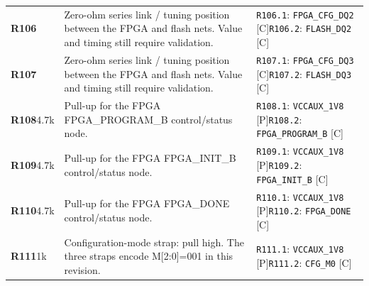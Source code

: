 \documentclass[11pt,a4paper]{article}
\begin{document}
\begin{longtable}{@{}P{27mm}P{83mm}P{58mm}@{}}
\textbf{R106} & Zero-ohm series link / tuning position between the FPGA and flash nets. Value and timing still require validation. & \nolinkurl{R106.1}: \nolinkurl{FPGA_CFG_DQ2} [C]\newline \nolinkurl{R106.2}: \nolinkurl{FLASH_DQ2} [C] \\
\textbf{R107} & Zero-ohm series link / tuning position between the FPGA and flash nets. Value and timing still require validation. & \nolinkurl{R107.1}: \nolinkurl{FPGA_CFG_DQ3} [C]\newline \nolinkurl{R107.2}: \nolinkurl{FLASH_DQ3} [C] \\
\textbf{R108}\newline 4.7k & Pull-up for the FPGA FPGA\_PROGRAM\_B control/status node. & \nolinkurl{R108.1}: \nolinkurl{VCCAUX_1V8} [P]\newline \nolinkurl{R108.2}: \nolinkurl{FPGA_PROGRAM_B} [C] \\
\textbf{R109}\newline 4.7k & Pull-up for the FPGA FPGA\_INIT\_B control/status node. & \nolinkurl{R109.1}: \nolinkurl{VCCAUX_1V8} [P]\newline \nolinkurl{R109.2}: \nolinkurl{FPGA_INIT_B} [C] \\
\textbf{R110}\newline 4.7k & Pull-up for the FPGA FPGA\_DONE control/status node. & \nolinkurl{R110.1}: \nolinkurl{VCCAUX_1V8} [P]\newline \nolinkurl{R110.2}: \nolinkurl{FPGA_DONE} [C] \\
\textbf{R111}\newline 1k & Configuration-mode strap: pull high. The three straps encode M[2:0]=001 in this revision. & \nolinkurl{R111.1}: \nolinkurl{VCCAUX_1V8} [P]\newline \nolinkurl{R111.2}: \nolinkurl{CFG_M0} [C] \\

\end{longtable}
\end{document}
